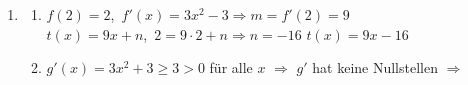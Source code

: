 \begin{loesungsteil}
\begin{enumerate}
  \item
  \begin{enumerate}
    \item $f(2) = 2$,\ $f'(x) = 3x^2 - 3 \Rightarrow m = f'(2) = 9$\\
          $t(x) = 9x + n$,\ $2 = 9 \cdot 2 + n \Rightarrow n = -16$\qquad
          $\boxed{t(x) = 9x - 16}$
    \item $g'(x) = 3x^2 + 3 \ge 3 > 0$ für alle $x$ $\Rightarrow$ $g'$ hat keine
          Nullstellen $\Rightarrow$ 
  \end{enumerate}
\end{enumerate}
\end{loesungsteil}
\fi

